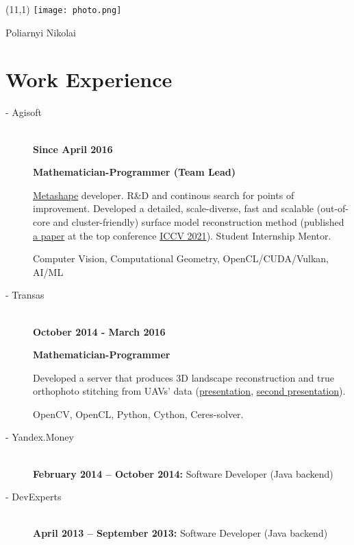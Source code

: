 \documentclass[11pt,oneside]{article}
\newcommand{\hhref}[2]{\href{#1}{\color{blue}#2}}
\begin{document}
\begin{textblock}{7}(11,1)
    \texttt{[image: photo.png]}
\end{textblock}

\begin{center}
	{\huge Poliarnyi Nikolai}
\end{center}

\vspace{-9pt}
\section*{\textbf{Work Experience}}
\vspace{-9pt}


\begin{description}
  \item[ - Agisoft] \hfill \\
    \textbf{Since April 2016}

    \textbf{Mathematician-Programmer (Team Lead)}

    \hhref{https://en.wikipedia.org/wiki/PhotoScan}{Metashape} developer. R\&D and continous search for points of improvement. Developed a detailed, scale-diverse, fast and scalable (out-of-core and cluster-friendly) surface model reconstruction method (published \hhref{https://www.polarnick.com/static/papers/poliarnyi2021.pdf}{a paper} at the top conference \hhref{http://iccv2021.thecvf.com/}{ICCV 2021}). Student Internship Mentor.

    Computer Vision, Computational Geometry, OpenCL/CUDA/Vulkan, AI/ML
  \item[ - Transas] \hfill \\
    \textbf{October 2014 - March 2016}

    \textbf{Mathematician-Programmer}

    Developed a server that produces 3D landscape reconstruction and true orthophoto stitching from UAVs' data (\hhref{http://polarnick239.github.io/old/cv/Monoceros1.pdf}{presentation}, \hhref{http://polarnick239.github.io/old/cv/Monoceros2.pdf}{second presentation}).

    OpenCV, OpenCL, Python, Cython, Ceres-solver.
  \item[ - Yandex.Money] \hfill \\
    \textbf{February 2014 – October 2014:} Software Developer (Java backend)
  \item[ - DevExperts] \hfill \\
    \textbf{April 2013 – September 2013:} Software Developer (Java backend)

\end{description}
\end{document}
